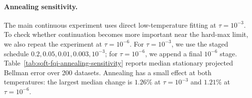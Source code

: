 \documentclass{article}
\theoremstyle{plain}
\theoremstyle{definition}
\theoremstyle{remark}
\begin{document}
\begin{table}[t]
\centering
\caption{Oracle-tuned Tikhonov sensitivity for estimated stationary weights and
minimax soft \(Q\). Entries are medians with interquartile ranges over the
corresponding sweep. The oracle criterion column indicates which metric was
used to choose the tuning rule within each family and regime.}
\label{tab:oracle-tuned-tikhonov}
\scriptsize
\resizebox{\linewidth}{!}{}
\end{table}

\paragraph{Annealing sensitivity.}
The main continuous experiment uses direct low-temperature fitting at
\(\tau=10^{-3}\). To check whether continuation becomes more important near the
hard-max limit, we also repeat the experiment at \(\tau=10^{-6}\). For
\(\tau=10^{-3}\), we use the staged schedule
\(0.2,0.05,0.01,0.003,10^{-3}\); for \(\tau=10^{-6}\), we append a final
\(10^{-6}\) stage. Table~\ref{tab:soft-fqi-annealing-sensitivity} reports
median stationary projected Bellman error over 200 datasets. Annealing has a
small effect at both temperatures: the largest median change is \(1.26\%\) at
\(\tau=10^{-3}\) and \(1.21\%\) at \(\tau=10^{-6}\).
\end{document}
